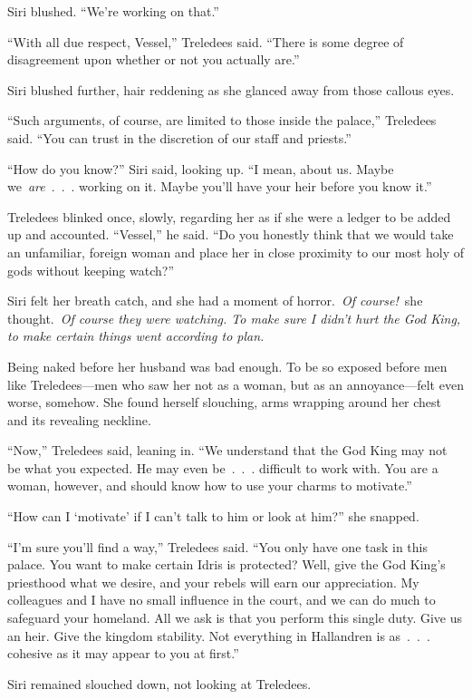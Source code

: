 Siri blushed. “We’re working on that.”

“With all due respect, Vessel,” Treledees said. “There is some degree of disagreement upon whether or not you actually are.”

Siri blushed further, hair reddening as she glanced away from those callous eyes.

“Such arguments, of course, are limited to those inside the palace,” Treledees said. “You can trust in the discretion of our staff and priests.”

“How do you know?” Siri said, looking up. “I mean, about us. Maybe we~\textit{are}~.~.~. working on it. Maybe you’ll have your heir before you know it.”

Treledees blinked once, slowly, regarding her as if she were a ledger to be added up and accounted. “Vessel,” he said. “Do you honestly think that we would take an unfamiliar, foreign woman and place her in close proximity to our most holy of gods without keeping watch?”

Siri felt her breath catch, and she had a moment of horror.~\textit{Of course!}~she thought.~\textit{Of course they were watching. To make sure I didn’t hurt the God King, to make certain things went according to plan.}

Being naked before her husband was bad enough. To be so exposed before men like Treledees—men who saw her not as a woman, but as an annoyance—felt even worse, somehow. She found herself slouching, arms wrapping around her chest and its revealing neckline.

“Now,” Treledees said, leaning in. “We understand that the God King may not be what you expected. He may even be~.~.~. difficult to work with. You are a woman, however, and should know how to use your charms to motivate.”

“How can I ‘motivate’ if I can’t talk to him or look at him?” she snapped.

“I’m sure you’ll find a way,” Treledees said. “You only have one task in this palace. You want to make certain Idris is protected? Well, give the God King’s priesthood what we desire, and your rebels will earn our appreciation. My colleagues and I have no small influence in the court, and we can do much to safeguard your homeland. All we ask is that you perform this single duty. Give us an heir. Give the kingdom stability. Not everything in Hallandren is as~.~.~. cohesive as it may appear to you at first.”

Siri remained slouched down, not looking at Treledees.

